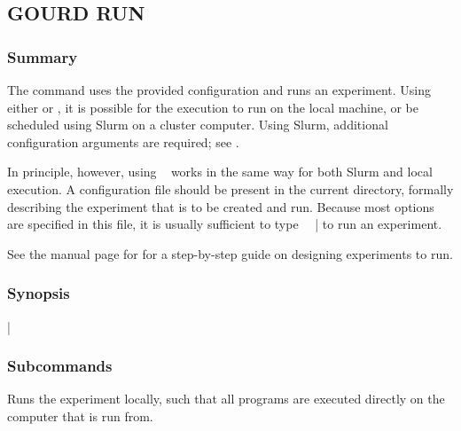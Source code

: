 \documentclass[a4paper,english]{article}
\begin{document}
\begin{adjustwidth}{18pt}{0pt}
        \subsection{GOURD RUN}

            \subsubsection{Summary}
                The   command uses the provided configuration and runs an
                experiment.
                Using either  or , it is possible for the execution
                to run on the local machine, or be scheduled using Slurm on a cluster computer.
                Using Slurm, additional configuration arguments are required; see
                .

                In principle, however, using ~ works in the same way for both
                Slurm and local execution.
                A  configuration file should be present in the current directory,
                formally describing the experiment that is to be created and run.
                Because most options are specified in this file, it is usually sufficient to type
                ~~| to run an experiment.

                See the manual page for  for a step-by-step guide on
                designing experiments to run.


            \subsubsection{Synopsis}
                |

            \subsubsection{Subcommands}
                \begin{Description}[Subcommands]
                    \item[\Arg{local}]
                        Runs the experiment locally, such that all programs are executed directly on the computer
                        that  is run from.


\end{Description}
\end{adjustwidth}
\end{document}
